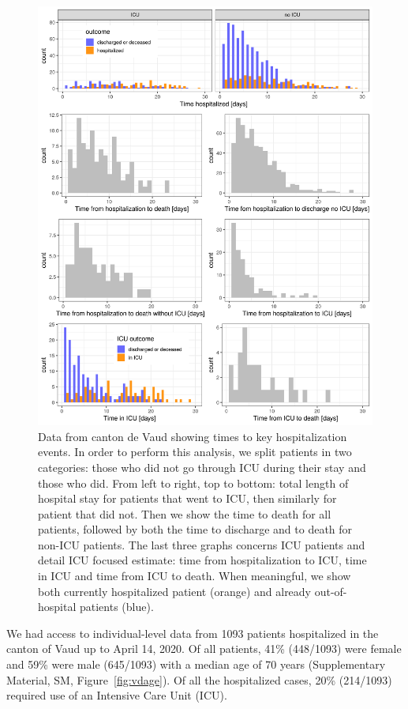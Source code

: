 \begin{figure}[!htb]
    \centering
    \includegraphics{fig_covid-switzerland-npi/fig_supp/VD_times.png}
    \caption[Key data of hospitalization events in canton de Vaud]{Data from canton de Vaud showing times to key hospitalization events. In order to perform this analysis, we split patients in two categories: those who did not go through ICU during their stay and those who did. From left to right, top to bottom: total length of hospital stay for patients that went to ICU, then similarly for patient that did not. Then we show the time to death for all patients, followed by both the time to discharge and to death for non-ICU patients. The last three graphs concerns ICU patients and detail ICU focused estimate: time from hospitalization to ICU, time in ICU and time from ICU to death. When meaningful, we show both currently hospitalized patient (orange) and already out-of-hospital patients (blue).}
    \label{fig:vdtimes}
\end{figure}


We had access to individual-level data from 1093 patients hospitalized in the canton of Vaud up to April 14, 2020. Of all patients, 41\% (448/1093) were female and 59\% were male (645/1093) with a median age of 70 years (Supplementary Material, SM, Figure~\ref{fig:vdage}). Of all the hospitalized cases, 20\% (214/1093) required use of an Intensive Care Unit (ICU).



